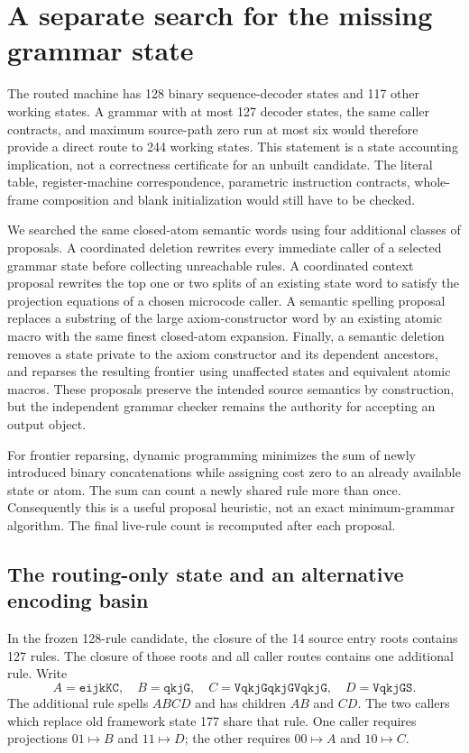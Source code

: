 \section{A separate search for the missing grammar state}
\label{sec:grammar-search}
The routed machine has 128 binary sequence-decoder states and 117 other
working states.  A grammar with at most 127 decoder states, the same caller
contracts, and maximum source-path zero run at most six would therefore
provide a direct route to 244 working states.  This statement is a state
accounting implication, not a correctness certificate for an unbuilt
candidate.  The literal table, register-machine correspondence, parametric
instruction contracts, whole-frame composition and blank initialization
would still have to be checked.

We searched the same closed-atom semantic words using four additional
classes of proposals.  A coordinated deletion rewrites every immediate
caller of a selected grammar state before collecting unreachable rules.
A coordinated context proposal rewrites the top one or two splits of an
existing state word to satisfy the projection equations of a chosen
microcode caller.  A semantic spelling proposal replaces a substring of
the large axiom-constructor word by an existing atomic macro with the same
finest closed-atom expansion.  Finally, a semantic deletion removes a
state private to the axiom constructor and its dependent ancestors, and
reparses the resulting frontier using unaffected states and equivalent
atomic macros.  These proposals preserve the intended source semantics
by construction, but the independent grammar checker remains the authority
for accepting an output object.

For frontier reparsing, dynamic programming minimizes the sum of newly
introduced binary concatenations while assigning cost zero to an already
available state or atom.  The sum can count a newly shared rule more than
once.  Consequently this is a useful proposal heuristic, not an exact
minimum-grammar algorithm.  The final live-rule count is recomputed after
each proposal.

\subsection{The routing-only state and an alternative encoding basin}
In the frozen 128-rule candidate, the closure of the 14 source entry roots
contains 127 rules.  The closure of those roots and all caller routes
contains one additional rule.  Write
\[
 A=\mathtt{eijkKC},\quad B=\mathtt{qkjG},\quad
 C=\mathtt{VqkjGqkjGVqkjG},\quad D=\mathtt{VqkjGS}.
\]
The additional rule spells $ABCD$ and has children $AB$ and $CD$.
The two callers which replace old framework state 177 share that rule.
One caller requires projections $01\mapsto B$ and $11\mapsto D$; the other
requires $00\mapsto A$ and $10\mapsto C$.

